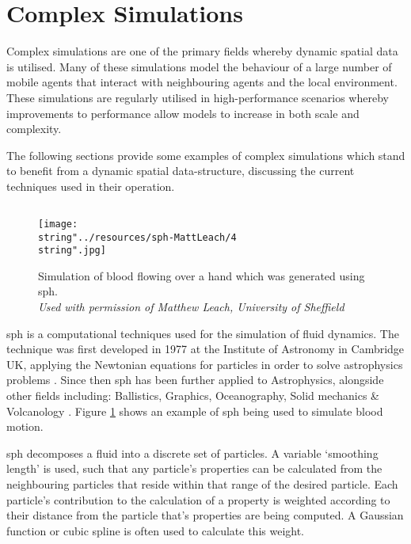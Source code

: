 \section{Complex Simulations\label{sec:complex-simulations}}
  Complex simulations are one of the primary fields whereby dynamic spatial data is utilised. Many of these simulations model the behaviour of a large number of mobile agents that interact with neighbouring agents and the local environment. These simulations are regularly utilised in high-performance scenarios whereby improvements to performance allow models to increase in both scale and complexity.
  
  The following sections provide some examples of complex simulations which stand to benefit from a dynamic spatial data-structure, discussing the current techniques used in their operation.

  \subsection{\label{sec:complex-sph}}
\begin{figure}
  \begin{centering}
    \texttt{[image: \\string"../resources/sph-MattLeach/4\\string".jpg]}
  \par\end{centering}
  \protect\caption[Simulation of blood flowing over a hand which was generated using \gls{sph}.]{\label{fig:sph}Simulation of blood flowing over a hand which was generated using \gls{sph}.\\ \em{Used with permission of Matthew Leach, University of Sheffield}}
\end{figure}
    \gls{sph} is a computational techniques used for the simulation of fluid dynamics. The technique was first developed in 1977 at the Institute of Astronomy in Cambridge UK, applying the Newtonian equations for particles in order to solve astrophysics problems \cite{GM77,Luc77}. Since then \gls{sph} has been further applied to Astrophysics, alongside other fields including: Ballistics, Graphics, Oceanography, Solid mechanics \& Volcanology \cite{Mon12}. Figure \ref{fig:sph} shows an example of \gls{sph} being used to simulate blood motion.
    
    \gls{sph} decomposes a fluid into a discrete set of particles. A variable `smoothing length' is used, such that any particle's properties can be calculated from the neighbouring particles that reside within that range of the desired particle. Each particle's contribution to the calculation of a property is weighted according to their distance from the particle that's properties are being computed. A Gaussian function or cubic spline is often used to calculate this weight.
    
